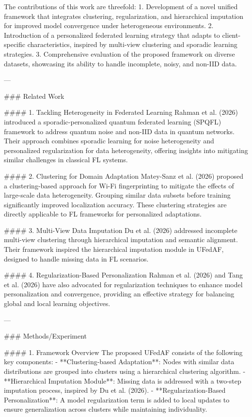 The contributions of this work are threefold:  
1. Development of a novel unified framework that integrates clustering, regularization, and hierarchical imputation for improved model convergence under heterogeneous environments.  
2. Introduction of a personalized federated learning strategy that adapts to client-specific characteristics, inspired by multi-view clustering and sporadic learning strategies.  
3. Comprehensive evaluation of the proposed framework on diverse datasets, showcasing its ability to handle incomplete, noisy, and non-IID data.  

---

### Related Work  

#### 1. Tackling Heterogeneity in Federated Learning  
Rahman et al. (2026) introduced a sporadic-personalized quantum federated learning (SPQFL) framework to address quantum noise and non-IID data in quantum networks. Their approach combines sporadic learning for noise heterogeneity and personalized regularization for data heterogeneity, offering insights into mitigating similar challenges in classical FL systems.  

#### 2. Clustering for Domain Adaptation  
Matey-Sanz et al. (2026) proposed a clustering-based approach for Wi-Fi fingerprinting to mitigate the effects of large-scale data heterogeneity. Grouping similar data subsets before training significantly improved localization accuracy. These clustering strategies are directly applicable to FL frameworks for personalized adaptations.  

#### 3. Multi-View Data Imputation  
Du et al. (2026) addressed incomplete multi-view clustering through hierarchical imputation and semantic alignment. Their framework inspired the hierarchical imputation module in UFedAF, designed to handle missing data in FL scenarios.  

#### 4. Regularization-Based Personalization  
Rahman et al. (2026) and Tang et al. (2026) have also advocated for regularization techniques to enhance model personalization and convergence, providing an effective strategy for balancing global and local learning objectives.  

---

### Methods/Experiment  

#### 1. Framework Overview  
The proposed UFedAF consists of the following key components:  
- **Clustering-based Adaptation**: Nodes with similar data distributions are grouped into clusters using a hierarchical clustering algorithm.  
- **Hierarchical Imputation Module**: Missing data is addressed with a two-step imputation process, inspired by Du et al. (2026).  
- **Regularization-Based Personalization**: A model regularization term is added to local updates to ensure generalization across clusters while maintaining individuality.  

